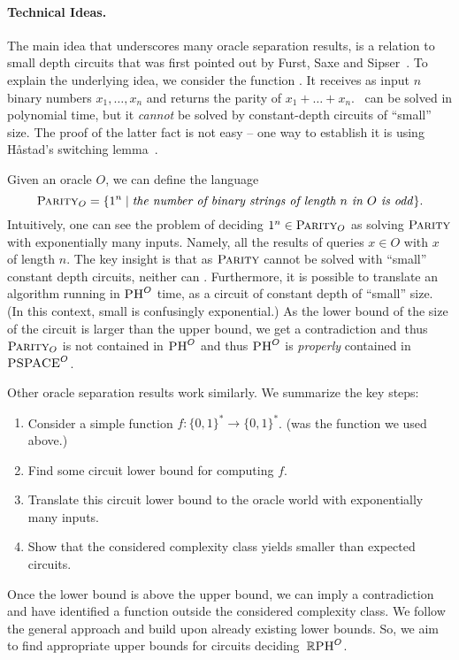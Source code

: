 \documentclass{article}
\begin{document}
\paragraph{Technical Ideas.}
The main idea that underscores many oracle separation results, is a relation to small depth circuits that was first pointed out by Furst, Saxe and Sipser~\cite{FSS84}.
To explain the underlying idea, we consider the function \Parityn. 
It receives as input $n$ binary numbers $x_1,\ldots,x_n$ and returns the parity of $x_1+\ldots +x_n$.
\Parityn\ can be solved in polynomial time, but it \textit{cannot} be solved by constant-depth circuits of ``small'' size.
The proof of the latter fact is not easy -- one way to establish it is using H\r astad's switching lemma~\cite{hastad1986}.

Given an oracle $O$, we can define the language 
\[\textsc{Parity}_O = \{ 1^n \mid \text{\emph{the number of binary strings of length $n$ in $O$ is odd}}\}.\]
Intuitively, one can see the problem of deciding $1^n \in \textsc{Parity}_O$ as solving $\textsc{Parity}$ with exponentially many inputs.
Namely, all the results of queries $x \in O$ with $x$ of length $n$.
The key insight is that as $\textsc{Parity}$ cannot be solved with ``small'' constant depth circuits, neither can \ParityA.
Furthermore, it is possible to translate an algorithm running in $\textsc{PH}^O$ time,
as a circuit of constant depth of ``small'' size.
(In this context, small is confusingly exponential.)
As the lower bound of the size of the circuit is larger than the upper bound, we get a contradiction and thus 
$\textsc{Parity}_O$ is not contained in $\textsc{PH}^O$ and thus $\textsc{PH}^O$ is \textit{properly} contained in $\textsc{PSPACE}^O$.

Other oracle separation results work similarly.
We summarize the key steps:

\begin{enumerate}
    \item Consider a simple function $f : \{0,1\}^*\rightarrow \{0,1\}^*$. (\Parity was the function we used above.)
    \item Find some circuit lower bound for computing $f$.
    \item Translate this circuit lower bound to the oracle world with exponentially many inputs.
    \item Show that the considered complexity class yields smaller than expected circuits.
\end{enumerate}
Once the lower bound is above the upper bound, we can imply a contradiction and have identified a function outside the considered complexity class.
We follow the general approach and build upon already existing lower bounds.
So, we aim to find appropriate upper bounds for circuits deciding~$\mathbb{R}\textsc{PH}^O$.  
\end{document}
